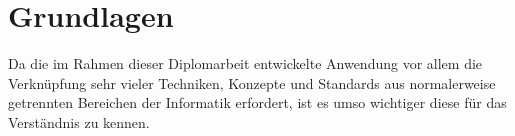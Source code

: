 \chapter{Grundlagen}

Da die im Rahmen dieser Diplomarbeit entwickelte Anwendung vor allem die 
Verknüpfung sehr vieler Techniken, Konzepte und Standards aus normalerweise 
getrennten Bereichen der Informatik erfordert, ist es umso wichtiger diese für 
das Verständnis zu kennen.





